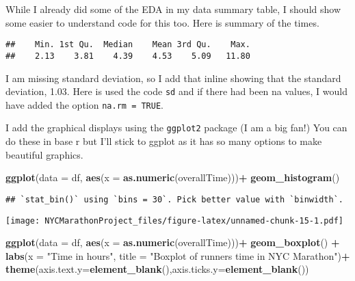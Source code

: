 \documentclass[
]{article}
\newenvironment{Shaded}{\begin{snugshade}}{\end{snugshade}}
\newcommand{\AttributeTok}[1]{\textcolor[rgb]{0.13,0.29,0.53}{#1}}
\newcommand{\FunctionTok}[1]{\textcolor[rgb]{0.13,0.29,0.53}{\textbf{#1}}}
\newcommand{\NormalTok}[1]{#1}
\newcommand{\SpecialCharTok}[1]{\textcolor[rgb]{0.81,0.36,0.00}{\textbf{#1}}}
\newcommand{\StringTok}[1]{\textcolor[rgb]{0.31,0.60,0.02}{#1}}
\begin{document}
While I already did some of the EDA in my data summary table, I should
show some easier to understand code for this too. Here is summary of the
times.

\begin{Shaded}
\end{Shaded}

\begin{verbatim}
##    Min. 1st Qu.  Median    Mean 3rd Qu.    Max. 
##    2.13    3.81    4.39    4.53    5.09   11.80
\end{verbatim}

I am missing standard deviation, so I add that inline showing that the
standard deviation, 1.03. Here is used the code \texttt{sd} and if there
had been na values, I would have added the option
\texttt{na.rm\ =\ TRUE}.

I add the graphical displays using the \texttt{ggplot2} package (I am a
big fan!) You can do these in base r but I'll stick to ggplot as it has
so many options to make beautiful graphics.

\begin{Shaded}
\begin{Highlighting}[]
\FunctionTok{ggplot}\NormalTok{(}\AttributeTok{data =}\NormalTok{ df, }\FunctionTok{aes}\NormalTok{(}\AttributeTok{x =} \FunctionTok{as.numeric}\NormalTok{(overallTime)))}\SpecialCharTok{+}
  \FunctionTok{geom\_histogram}\NormalTok{()}
\end{Highlighting}
\end{Shaded}

\begin{verbatim}
## `stat_bin()` using `bins = 30`. Pick better value with `binwidth`.
\end{verbatim}

\texttt{[image: NYCMarathonProject\_files/figure-latex/unnamed-chunk-15-1.pdf]}

\begin{Shaded}
\begin{Highlighting}[]
\FunctionTok{ggplot}\NormalTok{(}\AttributeTok{data =}\NormalTok{ df, }\FunctionTok{aes}\NormalTok{(}\AttributeTok{x =} \FunctionTok{as.numeric}\NormalTok{(overallTime)))}\SpecialCharTok{+}
  \FunctionTok{geom\_boxplot}\NormalTok{() }\SpecialCharTok{+}
  \FunctionTok{labs}\NormalTok{(}\AttributeTok{x =} \StringTok{"Time in hours"}\NormalTok{,}
       \AttributeTok{title =} \StringTok{"Boxplot of runners time in NYC Marathon"}\NormalTok{)}\SpecialCharTok{+}
  \FunctionTok{theme}\NormalTok{(}\AttributeTok{axis.text.y=}\FunctionTok{element\_blank}\NormalTok{(),}\AttributeTok{axis.ticks.y=}\FunctionTok{element\_blank}\NormalTok{())}
\end{Highlighting}
\end{Shaded}
\end{document}
